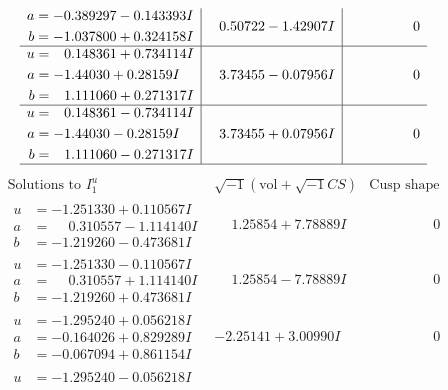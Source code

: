 \documentclass[1p]{elsarticle_modified}
\theoremstyle{definition}
\newcommand{\I}{\sqrt{-1}}
\begin{document}
$$\begin{array}{c|c|c}
\begin{aligned}
a &= -0.389297 - 0.143393 I \\
b &= -1.037800 + 0.324158 I\end{aligned}
 & \phantom{-}0.50722 - 1.42907 I & \phantom{-0.000000 } 0 \\ \hline\begin{aligned}
u &= \phantom{-}0.148361 + 0.734114 I \\
a &= -1.44030 + 0.28159 I \\
b &= \phantom{-}1.111060 + 0.271317 I\end{aligned}
 & \phantom{-}3.73455 - 0.07956 I & \phantom{-0.000000 } 0 \\ \hline\begin{aligned}
u &= \phantom{-}0.148361 - 0.734114 I \\
a &= -1.44030 - 0.28159 I \\
b &= \phantom{-}1.111060 - 0.271317 I\end{aligned}
 & \phantom{-}3.73455 + 0.07956 I & \phantom{-0.000000 } 0\\
 \hline 
 \end{array}$$\newpage$$\begin{array}{c|c|c}  
\text{Solutions to }I^u_{1}& \I (\text{vol} + \sqrt{-1}CS) & \text{Cusp shape}\\
 \hline 
\begin{aligned}
u &= -1.251330 + 0.110567 I \\
a &= \phantom{-}0.310557 - 1.114140 I \\
b &= -1.219260 - 0.473681 I\end{aligned}
 & \phantom{-}1.25854 + 7.78889 I & \phantom{-0.000000 } 0 \\ \hline\begin{aligned}
u &= -1.251330 - 0.110567 I \\
a &= \phantom{-}0.310557 + 1.114140 I \\
b &= -1.219260 + 0.473681 I\end{aligned}
 & \phantom{-}1.25854 - 7.78889 I & \phantom{-0.000000 } 0 \\ \hline\begin{aligned}
u &= -1.295240 + 0.056218 I \\
a &= -0.164026 + 0.829289 I \\
b &= -0.067094 + 0.861154 I\end{aligned}
 & -2.25141 + 3.00990 I & \phantom{-0.000000 } 0 \\ \hline\begin{aligned}
u &= -1.295240 - 0.056218 I \\

\end{aligned}
\end{array}$$
\end{document}

